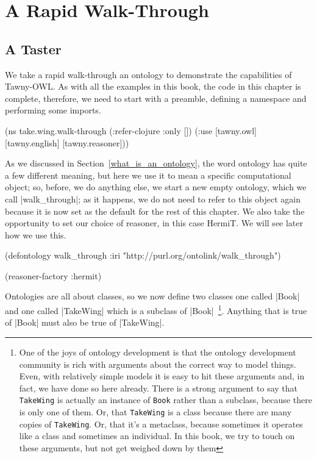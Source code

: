 
\chapter{A Rapid Walk-Through}
\label{cha:rapid-walk-through}

\section{A Taster}
\label{sec:taster}

We take a rapid walk-through an ontology to demonstrate the capabilities of
Tawny-OWL. As with all the examples in this book, the code in this chapter is
complete, therefore, we need to start with a preamble, defining a namespace
and performing some imports.

\begin{tawny}
(ns take.wing.walk-through
  (:refer-clojure :only [])
  (:use [tawny.owl]
        [tawny.english]
        [tawny.reasoner]))
\end{tawny}

As we discussed in Section~\ref{what_is_an_ontology}, the word ontology has
quite a few different meaning, but here we use it to mean a specific
computational object; so, before, we do anything else, we start a new empty
ontology, which we call |walk_through|; as it happens, we do not need to refer
to this object again because it is now set as the default for the rest of this
chapter. We also take the opportunity to set our choice of reasoner, in this
case HermiT. We will see later how we use this.

\begin{tawny}
(defontology walk_through
  :iri "http://purl.org/ontolink/walk_through")

(reasoner-factory :hermit)
\end{tawny}

Ontologies are all about classes, so we now define two classes one called
|Book| and one called |TakeWing| which is a subclass of |Book|~\footnote{One
  of the joys of ontology development is that the ontology development
  community is rich with arguments about the correct way to model things.
  Even, with relatively simple models it is easy to hit these arguments and,
  in fact, we have done so here already. There is a strong argument to say
  that \lstinline{TakeWing} is actually an instance of \lstinline{Book} rather
  than a subclass, because there is only one of them. Or, that
  \lstinline{TakeWing} is a class because there are many copies of \lstinline{TakeWing}.
  Or, that it's a metaclass, because sometimes it operates like a class and
  sometimes an individual. In this book, we try to touch on these arguments,
  but not get weighed down by them}. Anything that is true of |Book| must also
be true of |TakeWing|.

